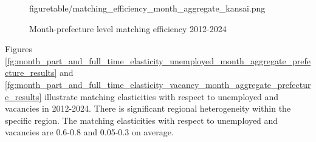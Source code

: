\documentclass[12pt]{article}
\begin{document}
\begin{figure}[!ht]
\begin{center}
{  {figuretable/matching_efficiency_month_aggregate_kansai.png}}
  \\
  \caption{Month-prefecture level matching efficiency 2012-2024}
  \label{fg:month_part_and_full_time_matching_efficiency_prefecture_results} 
  \end{center}
  \footnotesize
\end{figure} 

Figures \ref{fg:month_part_and_full_time_elasticity_unemployed_month_aggregate_prefecture_results} and \ref{fg:month_part_and_full_time_elasticity_vacancy_month_aggregate_prefecture_results} illustrate matching elasticities with respect to unemployed and vacancies in 2012-2024. 
There is significant regional heterogeneity within the specific region.
The matching elasticities with respect to unemployed and vacancies are 0.6-0.8 and 0.05-0.3 on average.
\end{document}
